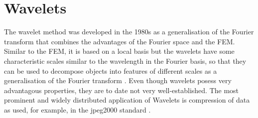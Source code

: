 {\section{Wavelets}
\label{ch:wavelet}
The wavelet method was developed in the 1980s \cite{waveletLA} as a generalisation of the Fourier transform that combines the advantages of the Fourier space and the FEM.
Similar to the FEM, it is based on a local basis but the wavelets have some characteristic scales similar to the wavelength in the Fourier basis, so that they can be used to decompose objects into features of different scales as a generalisation of the Fourier transform \cite{waveletLA, dahlke, FdFeWavelet}.
Even though wavelets posess very advantagous properties, they are to date not very well-established.
The most prominent and widely distributed application of Wavelets is compression of data as used, for example, in the jpeg2000 standard \cite{iso15444}.

}
